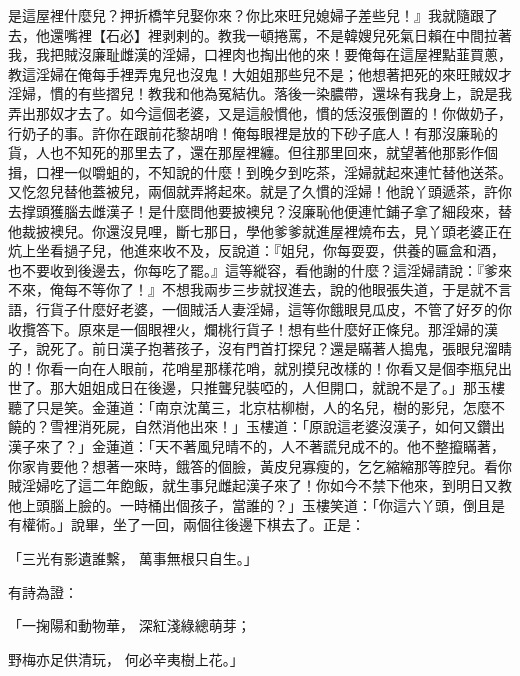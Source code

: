 \begin{showcontents}{}
是這屋裡什麼兒？押折橋竿兒娶你來？你比來旺兒媳婦子差些兒！』我就隨跟了去，他還嘴裡【石必】裡剥剌的。教我一頓捲罵，不是韓嫂兒死氣日賴在中間拉著我，我把賊沒廉耻雌漢的淫婦，口裡肉也掏出他的來！要俺每在這屋裡點韮買蔥，教這淫婦在俺每手裡弄鬼兒也沒鬼！大姐姐那些兒不是；他想著把死的來旺賊奴才淫婦，慣的有些摺兒！教我和他為冤結仇。落後一染膿帶，還垛有我身上，說是我弄出那奴才去了。如今這個老婆，又是這般慣他，慣的恁沒張倒置的！你做奶子，行奶子的事。許你在跟前花黎胡哨！俺每眼裡是放的下砂子底人！有那沒廉恥的貨，人也不知死的那里去了，還在那屋裡纏。但往那里回來，就望著他那影作個揖，口裡一似嚼蛆的，不知說的什麼！到晚夕到吃茶，淫婦就起來連忙替他送茶。又忔忽兒替他蓋被兒，兩個就弄將起來。就是了久慣的淫婦！他說丫頭遞茶，許你去撑頭獲腦去雌漢子！是什麼問他要披襖兒？沒廉恥他便連忙鋪子拿了細段來，替他裁披襖兒。你還沒見哩，斷七那日，學他爹爹就進屋裡燒布去，見丫頭老婆正在炕上坐看撾子兒，他進來收不及，反說道：『姐兒，你每耍耍，供養的匾盒和酒，也不要收到後邊去，你每吃了罷。』這等縱容，看他謝的什麼？這淫婦請說：『爹來不來，俺每不等你了！』不想我兩步三步就扠進去，說的他眼張失道，于是就不言語，行貨子什麼好老婆，一個賊活人妻淫婦，這等你餓眼見瓜皮，不管了好歹的你收攬答下。原來是一個眼裡火，爛桃行貨子！想有些什麼好正條兒。那淫婦的漢子，說死了。前日漢子抱著孩子，沒有門首打探兒？還是瞞著人搗鬼，張眼兒溜睛的！你看一向在人眼前，花哨星那樣花哨，就別摸兒改樣的！你看又是個李瓶兒出世了。那大姐姐成日在後邊，只推聾兒裝啞的，人但開口，就說不是了。」那玉樓聽了只是笑。金蓮道：「南京沈萬三，北京枯柳樹，人的名兒，樹的影兒，怎麼不饒的？雪裡消死屍，自然消他出來！」玉樓道：「原說這老婆沒漢子，如何又鑽出漢子來了？」金蓮道：「天不著風兒晴不的，人不著謊兒成不的。他不整攛瞞著，你家肯要他？想著一來時，餓答的個臉，黃皮兒寡瘦的，乞乞縮縮那等腔兒。看你賊淫婦吃了這二年飽飯，就生事兒雌起漢子來了！你如今不禁下他來，到明日又教他上頭腦上臉的。一時桶出個孩子，當誰的？」玉樓笑道：「你這六丫頭，倒且是有權術。」說畢，坐了一回，兩個往後邊下棋去了。正是：

「三光有影遺誰繫，  萬事無根只自生。」

有詩為證：

「一掬陽和動物華，  深紅淺綠總萌芽；

野梅亦足供清玩，  何必辛夷樹上花。」


\end{showcontents}
